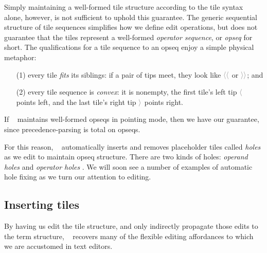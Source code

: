 Simply maintaining a well-formed tile structure
according to the tile syntax alone, however, is
not sufficient to uphold this guarantee.
The generic sequential structure of tile sequences
simplifies how we define edit operations, but
does not guarantee that the tiles represent a well-formed
\emph{operator sequence}, or \emph{opseq} for short.
The qualifications for a tile sequence to an opseq
enjoy a simple physical metaphor:
\begin{enumerate}
\item[(1)] every tile \emph{fits} its siblings:
  if a pair of tips meet, they look like $\ltiletip\ltiletip$
  or $\rtiletip\rtiletip$; and
\item[(2)] every tile sequence is \emph{convex}:
  it is nonempty, the first tile's left tip $\ltiletip$
  points left, and the last tile's right tip $\rtiletip$
  points right.
\end{enumerate}
If \tylr~ maintains well-formed opseqs in pointing mode, then we have
our guarantee, since precedence-parsing is total on opseqs.

For this reason, \tylr~ automatically inserts
and removes placeholder tiles called \emph{holes}
as we edit to maintain opseq structure.
There are two kinds of holes:
\emph{operand holes} \optile{\ophole}
and \emph{operator holes} \bintile{\binhole}.
We will soon see a number of examples of
automatic hole fixing as we turn our attention
to editing.




\subsection{Inserting tiles}
By having us edit the tile structure, and only
indirectly propagate those edits to the term structure,
\tylr~ recovers many of the flexible editing affordances to
which we are accustomed in text editors.


